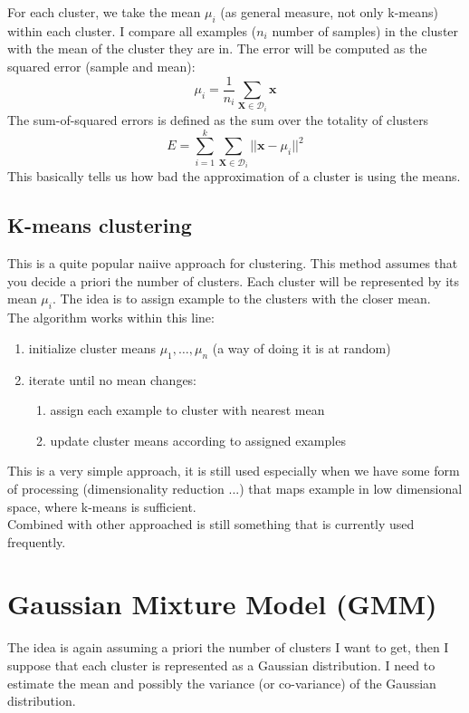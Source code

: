         For each cluster, we take the mean $\mu_i$ (as general measure, not only k-means) within each cluster. I compare all examples ($n_i$ number of samples) in the cluster with the mean of the cluster they are in. The error will be computed as the squared error (sample and mean): 
        $$\mu_i = \frac{1}{n_i} \sum_{\pmb{X} \in \mathcal{D}_i} \pmb{x}$$
        The sum-of-squared errors is defined as the sum over the totality of clusters
        $$E = \sum _{i=1}^k \sum_{\pmb{X} \in \mathcal{D}_i} || \pmb{x} - \mu_i|| ^ 2$$
        This basically tells us how bad the approximation of a cluster is using the means. 

    \subsection{K-means clustering}
        This is a quite popular naiive approach for clustering. This method assumes that you decide a priori the number of clusters. Each cluster will be represented by its mean $\mu_i$. The idea is to assign example to the clusters with the closer mean.\\

        The algorithm works within this line:
        \begin{enumerate}
            \item initialize cluster means $\mu_1, \dots, \mu_n$ (a way of doing it is at random)
            \item iterate until no mean changes:
            \begin{enumerate}
                \item assign each example to cluster with nearest mean
                \item update cluster means according to assigned examples
            \end{enumerate}
        \end{enumerate}

        This is a very simple approach, it is still used especially when we have some form of processing (dimensionality reduction ...) that maps example in low dimensional space, where k-means is sufficient. \\
        Combined with other approached is still something that is currently used frequently.
        
    \section{Gaussian Mixture Model (GMM)}
        The idea is again assuming a priori the number of clusters I want to get, then I suppose that each cluster is represented as a Gaussian distribution. I need to estimate the mean and possibly the variance (or co-variance) of the Gaussian distribution.

